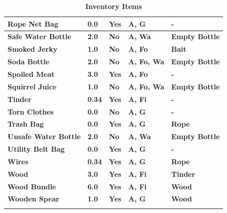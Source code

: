 \begin{longtable}{|C{10.555em}|C{4.0em}|C{4.0em}|C{6.445em}|C{11.055em}|}
			     \textbf{Rope Net Bag} & \textbf{0.0} & \textbf{Yes} & \textbf{A, G} & \textbf{-} \\
			    \midrule
			     \textbf{Safe Water Bottle} & \textbf{2.0} & \textbf{No} & \textbf{A, Wa} & \textbf{Empty Bottle} \\
			    \midrule
			     \textbf{Smoked Jerky} & \textbf{1.0} & \textbf{No} & \textbf{A, Fo} & \textbf{Bait} \\
			    \midrule
			     \textbf{Soda Bottle} & \textbf{2.0} & \textbf{No} & \textbf{A, Fo, Wa} & \textbf{Empty Bottle} \\
			    \midrule
			     \textbf{Spoiled Meat} & \textbf{3.0} & \textbf{Yes} & \textbf{A, Fo} & \textbf{-} \\
			    \midrule
			     \textbf{Squirrel Juice} & \textbf{1.0} & \textbf{No} & \textbf{A, Fo, Wa} & \textbf{Empty Bottle} \\
			    \midrule
			     \textbf{Tinder} & \textbf{0.34} & \textbf{Yes} & \textbf{A, Fi} & \textbf{-} \\
			    \midrule
			     \textbf{Torn Clothes} & \textbf{0.0} & \textbf{No} & \textbf{A, G} & \textbf{-} \\
			    \midrule
			     \textbf{Trash Bag} & \textbf{0.0} & \textbf{Yes} & \textbf{A, G} & \textbf{Rope} \\
			    \midrule
			     \textbf{Unsafe Water Bottle} & \textbf{2.0} & \textbf{No} & \textbf{A, Wa} & \textbf{Empty Bottle} \\
			    \midrule
			     \textbf{Utility Belt Bag} & \textbf{0.0} & \textbf{Yes} & \textbf{A, G} & \textbf{-} \\
			    \midrule
			     \textbf{Wires} & \textbf{0.34} & \textbf{Yes} & \textbf{A, G} & \textbf{Rope} \\
			    \midrule
			     \textbf{Wood} & \textbf{3.0} & \textbf{Yes} & \textbf{A, Fi} & \textbf{Tinder} \\
			    \midrule
			     \textbf{Wood Bundle} & \textbf{6.0} & \textbf{Yes} & \textbf{A, Fi} & \textbf{Wood} \\
			    \midrule
			     \textbf{Wooden Spear} & \textbf{1.0} & \textbf{Yes} & \textbf{A, G} & \textbf{Wood} \\
			    \bottomrule
			\caption{\textbf{Inventory Items}}
			\end{longtable}


